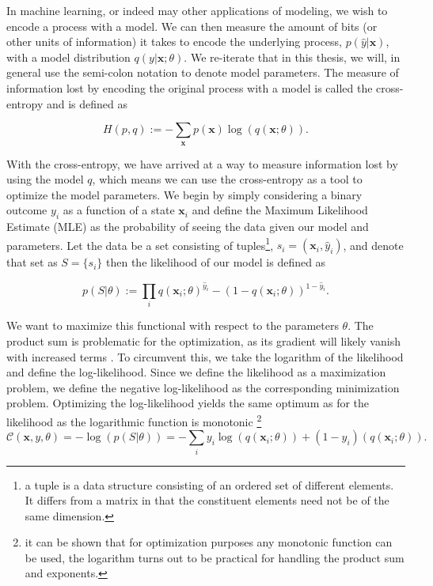 In machine learning, or indeed may other applications of modeling, we wish to encode a process with a model. We can then measure the amount of bits (or other units of information) it takes to encode the underlying process, $p(\hat{y} | \boldsymbol{x})$, with a model distribution $q(y| \boldsymbol{x}; \theta)$. We re-iterate that in this thesis, we will, in general use the semi-colon notation to denote model parameters. The measure of information lost by encoding the original process with a model is called the cross-entropy and is defined as

\begin{equation}
H(p, q) := - \sum_{\boldsymbol{x}} p(\boldsymbol{x})\log(q(\boldsymbol{x}; \theta)).
\end{equation}

\noindent With the cross-entropy, we have arrived at a way to measure information lost by using the model $q$, which means we can use the cross-entropy as a tool to optimize the model parameters. We begin by simply considering a binary outcome $y_i$ as a function of a state $\boldsymbol{x}_i$ and define the Maximum Likelihood Estimate (MLE) as the probability of seeing the data given our model and parameters. Let the data be a set consisting of tuples\footnote{a tuple is a data structure consisting of an ordered set of different elements. It differs from a matrix in that the constituent elements need not be of the same dimension.}, $s_i = (\boldsymbol{x}_i, \hat{y}_i)$, and denote that set as $S = \{s_i\}$ then the likelihood of our model is defined as 

\begin{equation}\label{eq:likelihood}
p(S | \theta) := \prod_i q(\boldsymbol{x}_i; \theta)^{\hat{y}_i} - (1-q(\boldsymbol{x}_i; \theta))^{1-\hat{y}_i}.
\end{equation}

\noindent We want to maximize this functional with respect to the parameters $\theta$. The product sum is problematic for the optimization, as its gradient will likely vanish with increased terms . To circumvent this, we take the logarithm of the likelihood and define the log-likelihood. Since we define the likelihood as a maximization problem, we define the negative log-likelihood as the corresponding minimization problem. Optimizing the log-likelihood yields the same optimum as for the likelihood as the logarithmic function is monotonic \footnote{it can be shown that for optimization purposes any monotonic function can be used, the logarithm turns out to be practical for handling the product sum and exponents.}
\begin{equation}\label{eq:mle}
\mathcal{C}(\boldsymbol{x}, y, \theta) = -\log(p(S | \theta)) = -\sum_i y_i\log(q(\boldsymbol{x}_i; \theta)) + (1-y_i)(q(\boldsymbol{x}_i; \theta)).
\end{equation}

